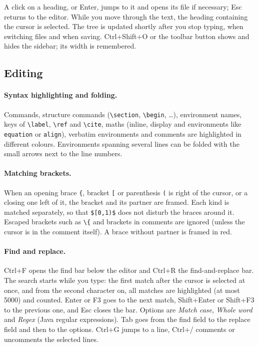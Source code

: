 \documentclass[11pt]{article}
\newcommand{\key}[1]{\textsf{#1}}
\begin{document}
    A click on a heading, or \key{Enter}, jumps to it and opens its file if necessary; \key{Esc} returns to the editor. While you move through the text, the heading containing the cursor is selected. The tree is updated shortly after you stop typing, when switching files and when saving. \key{Ctrl+Shift+O} or the toolbar button shows and hides the sidebar; its width is remembered.


    \subsection{Editing}

    \paragraph{Syntax highlighting and folding.}     Commands, structure commands (\verb+\section+, \verb+\begin+, \ldots), environment names, keys of \verb+\label+, \verb+\ref+ and \verb+\cite+, maths (inline, display and environments like \verb+equation+ or \verb+align+), verbatim environments and comments are highlighted in different colours. Environments spanning several lines can be folded with the small arrows next to the line numbers.

    \paragraph{Matching brackets.}     When an opening brace \verb+{+, bracket \verb+[+ or parenthesis \verb+(+ is right of the cursor, or a closing one left of it, the bracket and its partner are framed. Each kind is matched separately, so that \verb+$[0,1)$+ does not disturb the braces around it. Escaped brackets such as \verb+\{+ and brackets in comments are ignored (unless the cursor is in the comment itself). A brace without partner is framed in red.

    \paragraph{Find and replace.}     \key{Ctrl+F} opens the find bar below the editor and \key{Ctrl+R} the find-and-replace bar. The search starts while you type: the first match after the cursor is selected at once, and from the second character on, all matches are highlighted (at most 5000) and counted. \key{Enter} or \key{F3} goes to the next match, \key{Shift+Enter} or \key{Shift+F3} to the previous one, and \key{Esc} closes the bar. Options are \emph{Match case}, \emph{Whole word} and \emph{Regex} (Java regular expressions). \key{Tab} goes from the find field to the replace field and then to the options. \key{Ctrl+G} jumps to a line, \key{Ctrl+/} comments or uncomments the selected lines.
\end{document}
